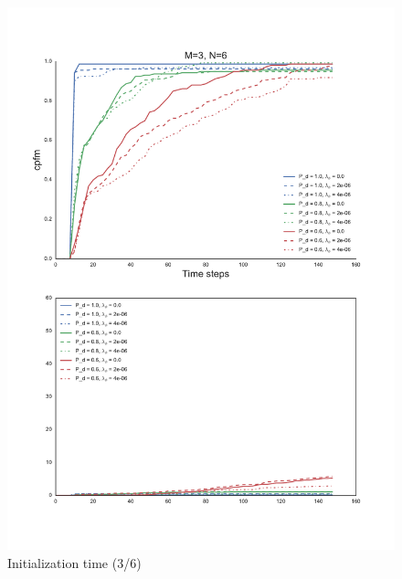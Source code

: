 {\begin{figure}
\centering
\includegraphics[height = .9\textheight]{Figures/plots/Scenario1_Init-Time(3-6).pdf}
\caption{Initialization time (3/6)}\label{fig:init_time_3-6}
\end{figure}


}